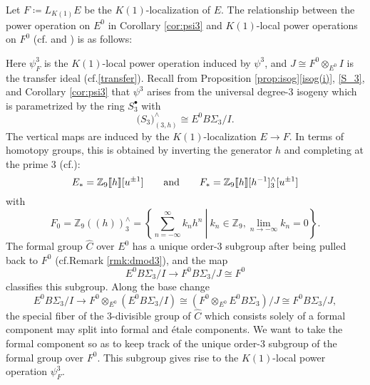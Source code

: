 \documentclass{gtpart}
\theoremstyle{definition}
\theoremstyle{remark}
\newcommand{\mb}[1]{\mathbb{#1}}
\newcommand{\cf}{cf.\thinspace}
\newcommand{\BZ}{{\mb Z}}
\newcommand{\HC}{\widehat{C}}
\newcommand{\ad}{{\rm and}}
\newcommand{\p}{\psi^3}
\newcommand{\s}{S^\bullet}
\newcommand{\isog}[1]{Proposition \ref{prop:isog}\thinspace \eqref{isog(#1)}}
\begin{document}
Let $F \coloneqq L_{K(1)} E$ be the $K(1)$-localization of $E$.  
The relationship between the power operation on $E^0$ in Corollary \ref{cor:psi3} 
and $K(1)$-local power operations on $F^0$ (\cf \cite[Section 3]{hopkins} and \cite[Section IX.3]{H_infty}) is as follows: 
\begin{center}
\end{center}
Here $\psi_F^3$ is the $K(1)$-local power operation induced by $\p$, and $J \cong F^0 \otimes_{E^0} I$ is the transfer ideal (\cf \eqref{transfer}).  
Recall from \isog{i}, \eqref{S_3}, and Corollary \ref{cor:psi3} that $\p$ arises from the universal degree-3 isogeny 
which is parametrized by the ring $\s_3$ with 
\[
 \big( S_3 \big)_{(3,h)}^\wedge \cong E^0 B\Sigma_3 / I.  
\]
The vertical maps are induced by the $K(1)$-localization $E \to F$.  In terms of 
homotopy groups, this is obtained by inverting the generator $h$ 
and completing at the prime 3 (\cf \cite[Corollary 1.5.5]{hovey}): 
\[
 E_* = \BZ_9 \llbracket h \rrbracket [u^{\pm1}] \qquad \ad \qquad F_* = \BZ_9 \llbracket h \rrbracket [h^{-1}]_3^\wedge [u^{\pm1}] 
\]
with 
\[
 F_0 = \BZ_9 (\!(h)\!)_3^\wedge = \left.\left\{\sum_{n = -\infty}^{\infty} k_n h^n~\right|~k_n \in \BZ_9, \lim_{n \to -\infty} k_n = 0\right\}.  
\]
The formal group $\HC$ over $E^0$ has a unique order-3 subgroup after being pulled back to $F^0$ (\cf Remark \ref{rmk:dmod3}), 
and the map 
\[
 E^0 B\Sigma_3 / I \to F^0 B\Sigma_3 / J \cong F^0 
\]
classifies this subgroup.  Along the base change 
\[
 E^0 B\Sigma_3 / I \to F^0 \otimes_{E^0} (E^0 B\Sigma_3 / I) \cong (F^0 \otimes_{E^0} E^0 B\Sigma_3) / J \cong F^0 B\Sigma_3 / J, 
\]
the special fiber of the 3-divisible group of $\HC$ which consists solely of a formal component may split into formal and \'etale components.  
We want to take the formal component so as to keep track of the unique order-3 subgroup of the formal group over $F^0$.  
This subgroup gives rise to the $K(1)$-local power operation $\psi_F^3$.  
\end{document}
